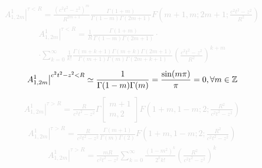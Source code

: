 %
\textcolor{lightgray}{ \begin{equation*} \begin{aligned}
\left. A_{1,2m}^1 \right|^{\tau < R} = \frac{(c^2t^2-z^2)^m}{R^{2m+1}}
\frac{\Gamma(1+m)}{\Gamma(1-m) \Gamma(2m+1)}
F \left( m+1, m; 2m+1; \frac{c^2t^2-z^2}{R^2} \right)
\end{aligned} \end{equation*} }
%
\textcolor{lightgray}{ \begin{equation*} \begin{aligned}
\left. A_{1,2m}^1 \right|^{\tau < R} = \frac{1}{R}
\frac{\Gamma(1+m)}{\Gamma(1-m) \Gamma(2m+1)} \cdot \\
\cdot \sum_{k=0}^\infty \frac{1}{k!} 
\frac{ \Gamma(m+k+1) \Gamma(m+k) \Gamma(2m+1) }
{ \Gamma(m+1) \Gamma(m) \Gamma(2m+k+1) }
\left( \frac{c^2t^2-z^2}{R^2} \right)^{k+m}
\end{aligned} \end{equation*} }
%
\begin{equation*} \begin{aligned}
\left. A_{1,2m}^1 \right|^{c^2t^2 - z^2 < R} \simeq
\frac{1}{ \Gamma(1-m) \Gamma(m) } = 
\frac{\sin(m \pi)}{\pi} = 0, \forall m \in \mathbb{Z}
\end{aligned} \end{equation*}
%
\textcolor{lightgray}{ \begin{equation*} \begin{aligned}
\left. A_{1,2m}^1 \right|^{\tau > R} = \frac{R}{c^2t^2-z^2}
\Gamma \left[ \begin{array}{l} m+1 \\ m, 2 \end{array} \right]
F \left( 1+m, 1-m; 2; \frac{R^2}{c^2t^2-z^2} \right)
\end{aligned} \end{equation*} }
%
\textcolor{lightgray}{ \begin{equation*} \begin{aligned}
\left. A_{1,2m}^1 \right|^{\tau > R} = \frac{R}{c^2t^2-z^2}
\frac{\Gamma(m+1)}{\Gamma(m) \Gamma(2)}
F \left( 1+m, 1-m; 2; \frac{R^2}{c^2t^2-z^2} \right)
\end{aligned} \end{equation*} }
%
\textcolor{lightgray}{ \begin{equation*} \begin{aligned}
\left. A_{1,2m}^1 \right|^{\tau > R} = \frac{mR}{c^2t^2-z^2}
\sum_{k=0}^\infty  \frac{\left( 1-m^2 \right)^k}{2^k k!} 
\left( \frac{R^2}{c^2t^2-z^2} \right)^{k}
\end{aligned} \end{equation*} }
